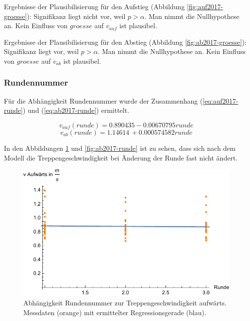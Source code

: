 Ergebnisse der Plausibilisierung für den Aufstieg 
(Abbildung \ref{fig:auf2017-groesse}):
Signifikanz liegt nicht vor, weil $p > \alpha$. Man nimmt die
Nullhypothese an. Kein Einfluss von $groesse$ auf $v_{auf}$ ist plausibel.

Ergebnisse der Plausibilisierung für den Abstieg
(Abbildung \ref{fig:ab2017-groesse}):
Signifikanz liegt vor, weil $p > \alpha$. Man nimmt die
Nullhypothese an. Kein Einfluss von $groesse$ auf $v_{ab}$ ist plausibel.


\subsubsection{Rundennummer}


Für die Abhängigkeit Rundennummer wurde 
der Zusammenhang (\ref{eq:auf2017-runde}) und (\ref{eq:ab2017-runde}) ermittelt.

\begin{equation} \label{eq:auf2017-runde}
v_{auf}(runde) = 0.890435 - 0.00670795 runde
\end{equation}
\begin{equation} \label{eq:ab2017-runde}
v_{ab}(runde) = 1.14614\, +0.000574582 runde
\end{equation}

In den Abbildungen \ref{fig:auf2017-runde} und \ref{fig:ab2017-runde} ist 
zu sehen, dass sich nach dem Modell die Treppengeschwindigkeit bei Änderung der Runde fast nicht ändert. 

\begin{figure} \centering 
	\includegraphics[]{abbildungen/regression/2017/auf-runde.pdf}
	
	\caption{Abhängigkeit Rundennummer zur Treppengeschwindigkeit aufwärts. Messdaten (orange) mit ermittelter Regressionsgerade (blau). \label{fig:auf2017-runde}}
\end{figure}

